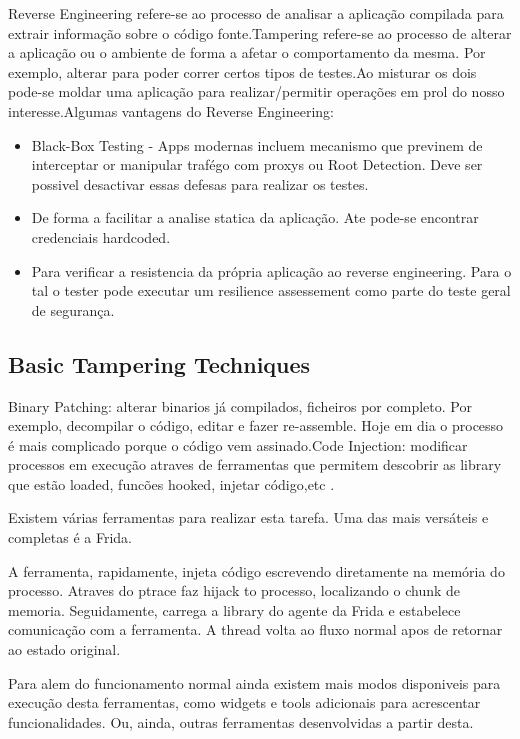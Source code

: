 Reverse Engineering refere-se ao processo de analisar a aplicação compilada para extrair informação sobre o código fonte.Tampering refere-se ao processo de alterar a aplicação ou o ambiente de forma a afetar o comportamento da mesma. Por exemplo, alterar para poder correr certos tipos de testes.Ao misturar os dois pode-se moldar uma aplicação para realizar/permitir operações em prol do nosso interesse.Algumas vantagens do Reverse Engineering:
\begin{itemize}

\item Black-Box Testing - Apps modernas incluem mecanismo que previnem de interceptar or manipular trafégo com proxys ou Root Detection. Deve ser possivel desactivar essas defesas para realizar os testes.

\item De forma a facilitar a analise statica da aplicação. Ate pode-se encontrar credenciais hardcoded.

\item Para verificar a resistencia da própria aplicação ao reverse engineering. Para o tal o tester pode executar um resilience assessement como parte do teste geral de segurança.

\end{itemize}

\subsection{ Basic Tampering Techniques }

Binary Patching: alterar binarios já compilados, ficheiros por completo. Por exemplo, decompilar o código, editar e fazer re-assemble. Hoje em dia o processo é mais complicado porque o código vem assinado.Code Injection: modificar processos em execução atraves de ferramentas que permitem descobrir as library que estão loaded, funcões hooked, injetar código,etc . 

Existem várias ferramentas para realizar esta tarefa. Uma das mais versáteis e completas é a Frida.

A ferramenta, rapidamente, injeta código escrevendo diretamente na memória do processo. Atraves do ptrace faz hijack to processo, localizando o chunk de memoria. Seguidamente, carrega a library do agente da Frida e estabelece comunicação com a ferramenta. A thread volta ao fluxo normal apos de retornar ao estado original.

Para alem do funcionamento normal ainda existem mais modos disponiveis para execução desta ferramentas, como widgets e tools adicionais para acrescentar funcionalidades. Ou, ainda, outras ferramentas desenvolvidas a partir desta.

